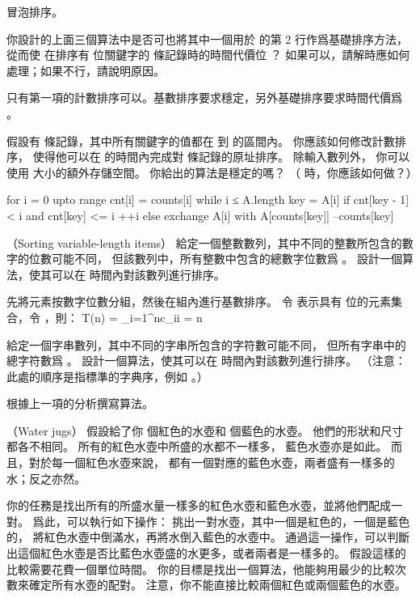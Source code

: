 \startANSWER
冒泡排序。
\stopANSWER

\startitem
你設計的上面三個算法中是否可也將其中一個用於  的第 2 行作爲基礎排序方法，
從而使  在排序有  位關鍵字的  條記錄時的時間代價位 ？
如果可以，請解時應如何處理；如果不行，請說明原因。
\stopitem

\startANSWER
只有第一項的計數排序可以。基數排序要求穩定，另外基礎排序要求時間代價爲 。
\stopANSWER

\startitem
假設有  條記錄，其中所有關鍵字的值都在  到  的區間內。
你應該如何修改計數排序，
使得他可以在  的時間內完成對  條記錄的原址排序。
除輸入數列外，
你可以使用  大小的額外存儲空間。
你給出的算法是穩定的嗎？
（\hint {} 時，你應該如何做？）
\stopitem

\startANSWER
\startCLRS
for i = 0 upto range
	cnt[i] = counts[i]
while i ≤ A.length
	key = A[i]
	if cnt[key - 1] < i and cnt[key] <= i
		++i
	else
		exchange A[i] with A[counts[key]]
		--counts[key]
\stopCLRS
\stopANSWER
\stopigBase
\stopPROBLEM

\startPROBLEM
（Sorting variable-length items）
\startigBase[a]
\startitem
給定一個整數數列，其中不同的整數所包含的數字的位數可能不同，
但該數列中，所有整數中包含的總數字位數爲 。
設計一個算法，使其可以在  時間內對該數列進行排序。
\stopitem

\startANSWER
先將元素按數字位數分組，然後在組內進行基數排序。
令  表示具有  位的元素集合，令 ，則：
\startformula
T(n) = \sum_{i=1}^{n}c_i\cdot i = n
\stopformula
\stopANSWER

\startitem
給定一個字串數列，其中不同的字串所包含的字符數可能不同，
但所有字串中的總字符數爲 。
設計一個算法，使其可以在  時間內對該數列進行排序。
（{\EMP 注意：}此處的順序是指標準的字典序，例如 。）
\stopitem

\startANSWER
根據上一項的分析撰寫算法。
\stopANSWER
\stopigBase
\stopPROBLEM

\startPROBLEM
（Water jugs）
假設給了你  個紅色的水壺和  個藍色的水壺。
他們的形狀和尺寸都各不相同。
所有的紅色水壺中所盛的水都不一樣多，
藍色水壺亦是如此。
而且，對於每一個紅色水壺來說，
都有一個對應的藍色水壺，兩者盛有一樣多的水；反之亦然。

你的任務是找出所有的所盛水量一樣多的紅色水壺和藍色水壺，並將他們配成一對。
爲此，可以執行如下操作：
挑出一對水壺，其中一個是紅色的，一個是藍色的，
將紅色水壺中倒滿水，再將水倒入藍色的水壺中。
通過這一操作，可以判斷出這個紅色水壺是否比藍色水壺盛的水更多，或者兩者是一樣多的。
假設這樣的比較需要花費一個單位時間。
你的目標是找出一個算法，他能夠用最少的比較次數來確定所有水壺的配對。
注意，你不能直接比較兩個紅色或兩個藍色的水壺。


